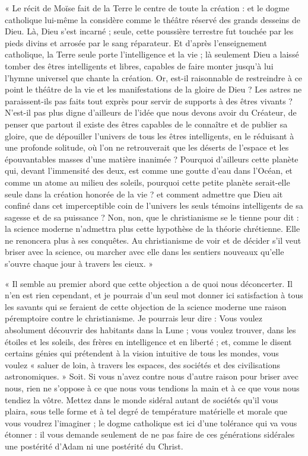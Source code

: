 \documentclass[a4paper, 11pt, oneside, landscape]{article}
\begin{document}
« Le récit de Moïse fait de la Terre le centre de toute la création : et le dogme catholique lui-même la considère comme le théâtre réservé des grands desseins de Dieu. Là, Dieu s'est incarné ; seule, cette poussière terrestre fut touchée par les pieds divins et arrosée par le sang réparateur. Et d'après l'enseignement catholique, la Terre seule porte l'intelligence et la vie ; là seulement Dieu a laissé tomber des êtres intelligents et libres, capables de faire monter jusqu'à lui l'hymne universel que chante la création. Or, est-il raisonnable de restreindre à ce point le théâtre de la vie et les manifestations de la gloire de Dieu ? Les astres ne paraissent-ils pas faits tout exprès pour servir de supports à des êtres vivants ? N'est-il pas plus digne d'ailleurs de l'idée que nous devons avoir du Créateur, de penser que partout il existe des êtres capables de le connaître et de publier sa gloire, que de dépouiller l'univers de tous les êtres intelligents, en le réduisant à une profonde solitude, où l'on ne retrouverait que les déserts de l'espace et les épouvantables masses d'une matière inanimée ? Pourquoi d'ailleurs cette planète qui, devant l'immensité des deux, est comme une goutte d'eau dans l'Océan, et comme un atome au milieu des soleils, pourquoi cette petite planète serait-elle seule dans la création honorée de la vie ? et comment admettre que Dieu ait confiné dans cet imperceptible coin de l'univers les seuls témoins intelligents de sa sagesse et de sa puissance ? Non, non, que le christianisme se le tienne pour dit : la science moderne n'admettra plus cette hypothèse de la théorie chrétienne. Elle ne renoncera plus à ses conquêtes. Au christianisme de voir et de décider s'il veut briser avec la science, ou marcher avec elle dans les sentiers nouveaux qu'elle s'ouvre chaque jour à travers les cieux. »

« Il semble au premier abord que cette objection a de quoi nous déconcerter. Il n'en est rien cependant, et je pourrais d'un seul mot donner ici satisfaction à tous les savants qui se feraient de cette objection de la science moderne une raison péremptoire contre le christianisme. Je pourrais leur dire : Vous voulez absolument découvrir des habitants dans la Lune ; vous voulez trouver, dans les étoiles et les soleils, des frères en intelligence et en liberté ; et, comme le disent certains génies qui prétendent à la vision intuitive de tous les mondes, vous voulez « saluer de loin, à travers les espaces, des sociétés et des civilisations astronomiques. » Soit. Si vous n'avez contre nous d'autre raison pour briser avec nous, rien ne s'oppose à ce que nous vous tendions la main et à ce que vous nous tendiez la vôtre. Mettez dans le monde sidéral autant de sociétés qu'il vous plaira, sous telle forme et à tel degré de température matérielle et morale que vous voudrez l'imaginer ; le dogme catholique est ici d'une tolérance qui va vous étonner : il vous demande seulement de ne pas faire de ces générations sidérales une postérité d'Adam ni une postérité du Christ.
\end{document}
